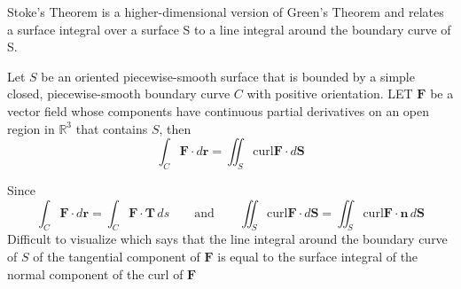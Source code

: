 \documentclass[../main.tex]{subfiles}
\begin{document}
Stoke's Theorem is a higher-dimensional version of Green's Theorem and relates a surface integral over a surface S to a line integral around the boundary curve of S.

\begin{theorem}
Let $S$ be an oriented piecewise-smooth surface that is bounded by a simple closed, piecewise-smooth boundary curve $C$ with positive orientation. LET $\textbf{F}$ be a vector field whose components have continuous partial derivatives on an open region in $\mathbb{R}^3$ that contains $S$, then
\begin{equation*}
\int_C{\textbf{F}\cdot d\textbf{r}} = \iint_S{\text{curl} \textbf{F}\cdot d\textbf{S}}
\end{equation*}
\end{theorem}
Since
\begin{equation*}
\int_C{\textbf{F}\cdot d\textbf{r} = \int_C{\textbf{F}\cdot \textbf{T}\,ds}}\qquad\text{and}\qquad\iint_S{\text{curl} \textbf{F}\cdot d\textbf{S}} = \iint_S{\text{curl} \textbf{F}\cdot \textbf{n}\,d\textbf{S}}
\end{equation*}
\color{red}Difficult to visualize\color{black}
which says that the line integral around the boundary curve of $S$ of the tangential component of $\textbf{F}$ is equal to the surface integral of the normal component of the curl of $\textbf{F}$
\end{document}
